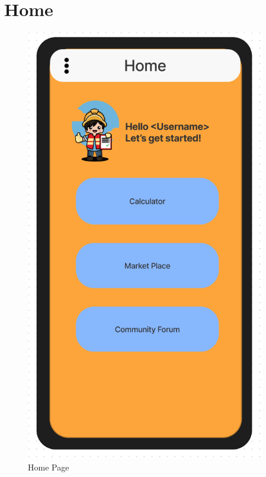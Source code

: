 \documentclass[title page]{article}
\begin{document}
\section{Home}
\begin{figure}[!h]
    \begin{center}
          \includegraphics[height=19cm]{images/home.png}
          \caption{Home Page}
          \label{fig:home}
    \end{center}
\end{figure}
\end{document}
